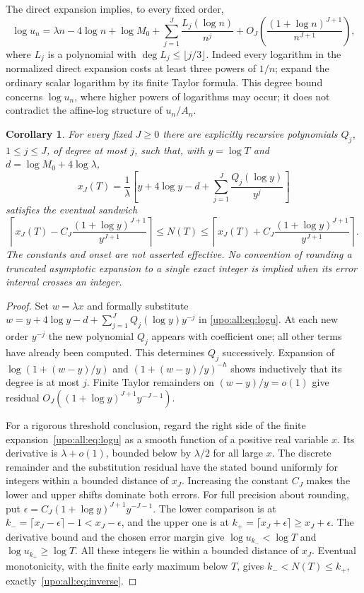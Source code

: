 \documentclass[11pt,letterpaper]{article}
\newtheorem{corollary}[theorem]{Corollary}
\theoremstyle{remark}\newtheorem{remark}[theorem]{Remark}
\numberwithin{equation}{section}
\begin{document}
The direct expansion implies, to every fixed order,
\begin{equation}\label{upo:all:eq:logu}
\log u_n=\lambda n-4\log n+\log M_0
 +\sum_{j=1}^{J}\frac{L_j(\log n)}{n^j}
 +O_J\left(\frac{(1+\log n)^{J+1}}{n^{J+1}}\right),
\end{equation}
where $L_j$ is a polynomial with $\deg L_j\le\lfloor j/3\rfloor$.
Indeed every logarithm in the normalized direct expansion costs at
least three powers of $1/n$; expand the ordinary scalar logarithm by
its finite Taylor formula. This degree bound concerns $\log u_n$,
where higher powers of logarithms may occur; it does not contradict the
affine-log structure of $u_n/A_n$.

\begin{corollary}\label{upo:all:cor:inverse}
For every fixed $J\ge0$ there are explicitly recursive polynomials
$Q_j$, $1\le j\le J$, of degree at most $j$, such that, with
$y=\log T$ and $d=\log M_0+4\log\lambda$,
\[
x_J(T)=\frac1\lambda\left[y+4\log y-d
 +\sum_{j=1}^J\frac{Q_j(\log y)}{y^j}\right]
\]
satisfies the eventual sandwich
\begin{equation}\label{upo:all:eq:inverse}
\left\lceil x_J(T)-C_J\frac{(1+\log y)^{J+1}}{y^{J+1}}\right\rceil
 \le N(T)\le
\left\lceil x_J(T)+C_J\frac{(1+\log y)^{J+1}}{y^{J+1}}\right\rceil.
\end{equation}
The constants and onset are not asserted effective. No convention of
rounding a truncated asymptotic expansion to a single exact integer is
implied when its error interval crosses an integer.
\end{corollary}
\begin{proof}
Set $w=\lambda x$ and formally substitute
$w=y+4\log y-d+\sum_{j=1}^JQ_j(\log y)y^{-j}$ in
\eqref{upo:all:eq:logu}. At each new order $y^{-j}$ the new polynomial $Q_j$
appears with coefficient one; all other terms have already been
computed. This determines $Q_j$ successively. Expansion of
$\log(1+(w-y)/y)$ and $(1+(w-y)/y)^{-h}$ shows inductively that its
degree is at most $j$. Finite Taylor remainders on $(w-y)/y=o(1)$ give
residual $O_J((1+\log y)^{J+1}y^{-J-1})$.

For a rigorous threshold conclusion, regard the right side of the
finite expansion~\eqref{upo:all:eq:logu} as a smooth function of a positive
real variable $x$. Its derivative is $\lambda+o(1)$, bounded below by
$\lambda/2$ for all large $x$. The discrete remainder and the
substitution residual have the stated bound uniformly for integers
within a bounded distance of $x_J$. Increasing the constant $C_J$ makes
the lower and upper shifts dominate both errors. For full precision about rounding, put
$\epsilon=C_J(1+\log y)^{J+1}y^{-J-1}$. The lower comparison is at
$k_-=\lceil x_J-\epsilon\rceil-1<x_J-\epsilon$, and the upper one
is at $k_+=\lceil x_J+\epsilon\rceil\ge x_J+\epsilon$.
The derivative bound and the chosen error margin give
$\log u_{k_-}<\log T$ and $\log u_{k_+}\ge\log T$.
All these integers lie within a bounded distance of $x_J$.
Eventual monotonicity, with the finite early maximum below $T$, gives
$k_-<N(T)\le k_+$, exactly~\eqref{upo:all:eq:inverse}.
\end{proof}
\end{document}
